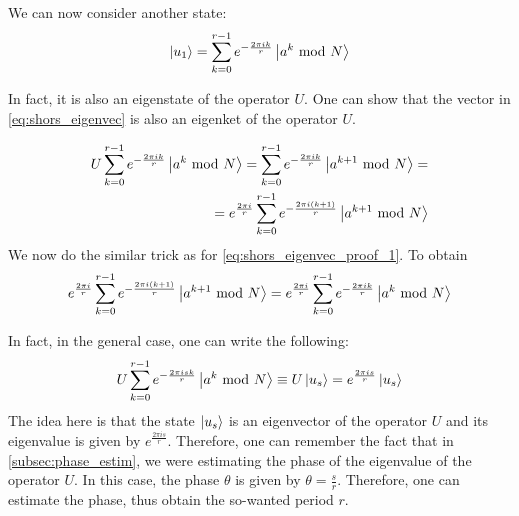 We can now consider another state: 
\begin{gather}
  \ket{u_1} = \sum_{k=0}^{r-1}e^{-\frac{2\pi ik}{r}} \ket{a^k \text{ mod } N}
  \label{eq:shors_eigenvec}
\end{gather}

In fact, it is also an eigenstate of the operator $U$.
One can show that the vector in \autoref{eq:shors_eigenvec} is also an eigenket of the operator $U$. 

\begin{equation}
  \begin{split}
    U \sum_{k=0}^{r-1} e^{-\frac{2\pi ik}{r}} \ket{a^k\text{ mod } N} = \sum_{k=0}^{r-1} e^{-\frac{2\pi ik}{r}} \ket{a^{k+1}\text{ mod } N} = \\
    = e^{\frac{2\pi i}{r}} \sum_{k=0}^{r-1} e^{-\frac{2\pi i(k+1)}{r}} \ket{a^{k+1}\text{ mod }N}
  \end{split}
\end{equation}
We now do the similar trick as for \autoref{eq:shors_eigenvec_proof_1}. To obtain 
\begin{equation}
  \begin{split}
    e^{\frac{2\pi i}{r}} \sum_{k=0}^{r-1} e^{-\frac{2\pi i(k+1)}{r}} \ket{a^{k+1}\text{ mod }N} = 
    e^{\frac{2\pi i}{r}} \sum_{k=0}^{r-1} e^{-\frac{2\pi ik}{r}} \ket{a^k\text{ mod } N} \\
  \end{split}
\end{equation}

In fact, in the general case, one can write the following:
\begin{gather}
  U \sum_{k=0}^{r-1}e^{-\frac{2\pi i sk}{r}}\ket{a^k \text{ mod }N} \equiv U\ket{u_s} = e^{\frac{2\pi is}{r}}\ket{u_s}
\end{gather}
The idea here is that the state $\ket{u_s}$ is an eigenvector of the operator $U$ and its eigenvalue is given by $e^{\frac{2\pi is}{r}}$.
Therefore, one can remember the fact that in \autoref{subsec:phase_estim}, we were estimating the phase of the eigenvalue 
of the operator $U$. In this case, the phase $\theta$ is given by $\theta = \frac{s}{r}$. Therefore, one can estimate the phase, thus obtain 
the so-wanted period $r$.

















